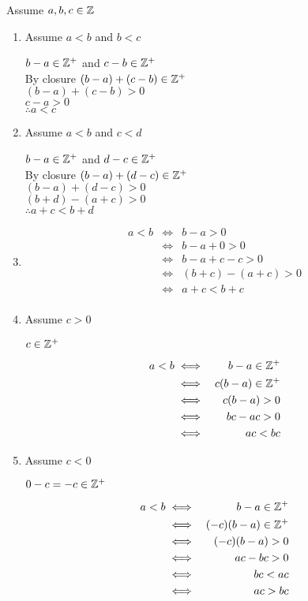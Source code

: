 \documentclass[letterpaper,12pt,fleqn]{article}
\begin{document}
\begin{theproof}
  Assume $a,b,c\in\mathbb{Z}$
  \begin{enumerate}
  \item Assume $a<b$ and $b<c$

    $b-a\in\mathbb{Z}^+$ and $c-b\in\mathbb{Z}^+$ \\
    By closure $(b-a)+(c-b)\in\mathbb{Z}^+$ \\
    $(b-a)+(c-b)>0$ \\
    $c-a>0$ \\
    $\therefore a<c$

  \item Assume $a<b$ and $c<d$

    $b-a\in\mathbb{Z}^+$ and $d-c\in\mathbb{Z}^+$ \\
    By closure $(b-a)+(d-c)\in\mathbb{Z}^+$ \\
    $(b-a)+(d-c)>0$ \\
    $(b+d)-(a+c)>0$ \\
    $\therefore a+c<b+d$

  \item \begin{eqnarray*}
    a<b &\iff& b-a>0 \\
    &\iff& b-a+0>0 \\
    &\iff& b-a+c-c>0 \\
    &\iff& (b+c)-(a+c)>0 \\
    &\iff& a+c<b+c \\
  \end{eqnarray*}
\newpage
  \item Assume $c>0$
    
    $c\in\mathbb{Z}^+$

    \begin{eqnarray*}
      a<b &\iff& b-a\in\mathbb{Z}^+ \\
      &\iff& c(b-a)\in\mathbb{Z}^+ \\
      &\iff& c(b-a)>0 \\
      &\iff& bc-ac>0 \\
      &\iff& ac<bc \\
    \end{eqnarray*}

  \item Assume $c<0$
    
    $0-c=-c\in\mathbb{Z}^+$

    \begin{eqnarray*}
      a<b &\iff& b-a\in\mathbb{Z}^+ \\
      &\iff& (-c)(b-a)\in\mathbb{Z}^+ \\
      &\iff& (-c)(b-a)>0 \\
      &\iff& ac-bc>0 \\
      &\iff& bc<ac \\
      &\iff& ac>bc \\
    \end{eqnarray*}
  \end{enumerate}
\end{theproof}
\end{document}
